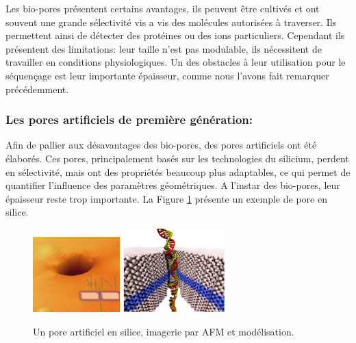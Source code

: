 \documentclass[a4paper,11pt]{article}
\begin{document}
Les bio-pores présentent certains avantages, ils peuvent être cultivés et ont souvent une grande sélectivité vis a vis des molécules autorisées à traverser. Ils permettent ainsi de détecter des protéines ou des ions particuliers. Cependant ils présentent des limitations: leur taille n'est pas modulable, ils nécessitent de travailler en conditions physiologiques. Un des obstacles à leur utilisation pour le séquençage est leur importante épaisseur, comme nous l'avons fait remarquer précédemment.


\subsubsection*{Les pores artificiels de première génération:}

Afin de pallier aux désavantages des bio-pores, des pores artificiels ont été élaborés. Ces pores, principalement basés sur les technologies du silicium, perdent en sélectivité, mais ont des propriétés beaucoup plus adaptables, ce qui permet de quantifier l'influence des paramètres géométriques. A l'instar des bio-pores, leur épaisseur reste trop importante. La Figure \ref{artificialpore} présente un exemple de pore en silice.

\begin{figure}[H]
\begin{center}
\includegraphics[width=0.3\textwidth]{artificialpore.png} \hspace{0.02\textwidth}
\includegraphics[width=0.35\textwidth]{nanoporeart.jpg}

\caption{Un pore artificiel en silice, imagerie par AFM et modélisation.}
\label{artificialpore}
\end{center}
\end{figure}
\end{document}

